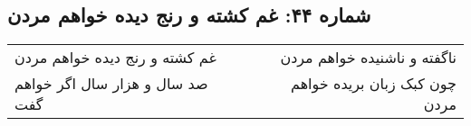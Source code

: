 \begin{center}
\section*{شماره ۴۴: غم کشته و رنج دیده خواهم مردن}
\label{sec:044}
\begin{longtable}{l p{0.5cm} r}
غم کشته و رنج دیده خواهم مردن
&&
ناگفته و ناشنیده خواهم مردن
\\
صد سال و هزار سال اگر خواهم گفت
&&
چون کبک زبان بریده خواهم مردن
\\
\end{longtable}
\end{center}

